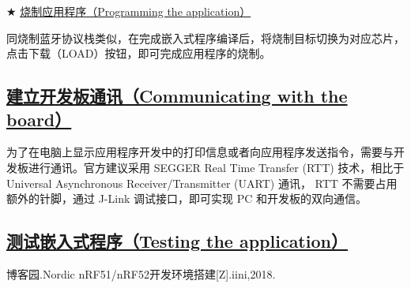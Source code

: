 \documentclass{WHUResearch}  %
\begin{document}
$\bigstar$ \href{https://infocenter.nordicsemi.com/index.jsp?topic=\%2Fug_gsg_keil\%2FUG\%2Fgsg\%2Fprogram_app_keil.html}{烧制应用程序（Programming the application）}

同烧制蓝牙协议栈类似，在完成嵌入式程序编译后，将烧制目标切换为对应芯片，点击下载（LOAD）按钮，即可完成应用程序的烧制。

\subsection{\href{https://infocenter.nordicsemi.com/index.jsp?topic=\%2Fug_gsg_keil\%2FUG\%2Fgsg\%2Fcommunicate.html&cp=1_1_1_8}{建立开发板通讯（Communicating with the board）}}

为了在电脑上显示应用程序开发中的打印信息或者向应用程序发送指令，需要与开发板进行通讯。官方建议采用 SEGGER Real Time Transfer (RTT) 技术，相比于 Universal Asynchronous Receiver/Transmitter (UART) 通讯， RTT 不需要占用额外的针脚，通过 J-Link 调试接口，即可实现 PC 和开发板的双向通信。

\subsection{\href{https://infocenter.nordicsemi.com/index.jsp?topic=\%2Fug_gsg_keil\%2FUG\%2Fgsg\%2Ftest.html&cp=1_1_1_9}{测试嵌入式程序（Testing the application）}}


\cleardoublepage{}
{}
\begin{thebibliography}{000}

   博客园.Nordic nRF51/nRF52开发环境搭建[Z].iini,2018.  
  
\end{thebibliography}

\cleardoublepage
\end{document}
